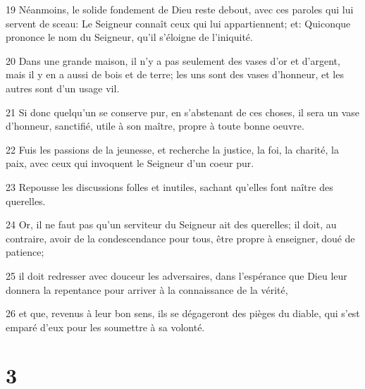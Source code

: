 \par 19 Néanmoins, le solide fondement de Dieu reste debout, avec ces paroles qui lui servent de sceau: Le Seigneur connaît ceux qui lui appartiennent; et: Quiconque prononce le nom du Seigneur, qu'il s'éloigne de l'iniquité.
\par 20 Dans une grande maison, il n'y a pas seulement des vases d'or et d'argent, mais il y en a aussi de bois et de terre; les uns sont des vases d'honneur, et les autres sont d'un usage vil.
\par 21 Si donc quelqu'un se conserve pur, en s'abstenant de ces choses, il sera un vase d'honneur, sanctifié, utile à son maître, propre à toute bonne oeuvre.
\par 22 Fuis les passions de la jeunesse, et recherche la justice, la foi, la charité, la paix, avec ceux qui invoquent le Seigneur d'un coeur pur.
\par 23 Repousse les discussions folles et inutiles, sachant qu'elles font naître des querelles.
\par 24 Or, il ne faut pas qu'un serviteur du Seigneur ait des querelles; il doit, au contraire, avoir de la condescendance pour tous, être propre à enseigner, doué de patience;
\par 25 il doit redresser avec douceur les adversaires, dans l'espérance que Dieu leur donnera la repentance pour arriver à la connaissance de la vérité,
\par 26 et que, revenus à leur bon sens, ils se dégageront des pièges du diable, qui s'est emparé d'eux pour les soumettre à sa volonté.

\chapter{3}

